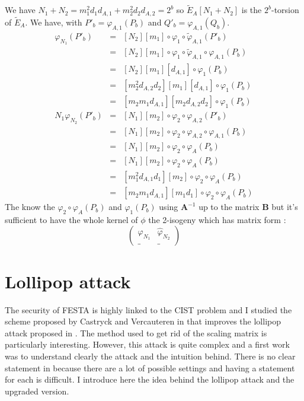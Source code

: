\documentclass[12pt,a4paper]{article}
\begin{document}
		We have $N_1 + N_2 = m_1^2d_1d_{A,1} + m_2^2d_2d_{A,2}=2^b$ so $\tilde{E}_A[N_1+N_2]$ is
		the $2^b$-torsion of $\tilde E_A$. We have, with $P'_b=\varphi_{A,1}(P_b)$ and 
		$Q'_b=\varphi_{A,1}(Q_b)$.
		\begin{eqnarray*}
			[N_2]\varphi_{N_1}(P'_b) & = & [N_2][m_1]\circ\varphi_1\circ\tilde\varphi_{A,1}(P'_b) \\
															 & = & [N_2][m_1]\circ\varphi_1\circ\tilde\varphi_{A,1}
															 \circ\varphi_{A,1}(P_b) \\
															 & = & [N_2][m_1][d_{A,1}]\circ\varphi_1(P_b) \\
															 & = & [m_2^2d_{A,2}d_2][m_1][d_{A,1}]\circ\varphi_1(P_b) \\
															 & = & [m_2m_1d_{A,1}][m_2d_{A,2}d_2]\circ\varphi_1(P_b) \\
			N_1\varphi_{N_2}(P'_b) & = & [N_1][m_2]\circ\varphi_2\circ\varphi_{A,2}(P'_b) \\
														 & = & [N_1][m_2]\circ\varphi_2\circ\varphi_{A,2}\circ\varphi_{A,1}(P_b) \\
														 & = & [N_1][m_2]\circ\varphi_2\circ\varphi_A(P_b) \\
														 & = & [N_1][m_2]\circ\varphi_2\circ\varphi_A(P_b) \\
														 & = & [m_1^2d_{A,1}d_1][m_2]\circ\varphi_2\circ\varphi_A(P_b) \\
														 & = & [m_2m_1d_{A,1}][m_1d_1]\circ\varphi_2\circ\varphi_A(P_b) 
		\end{eqnarray*}
		The know the $\varphi_2\circ\varphi_A(P_b)$ and $\varphi_1(P_b)$ using $\mathbf A^{-1}$
		up to the matrix $\mathbf B$ but
		it's sufficient to have the whole kernel of $\phi$ the 2-isogeny which has matrix form :
		$$\begin{pmatrix}
			\varphi_{N_1} & \widehat\varphi_{N_2} \\
		\_ & \_ \end{pmatrix}
		$$


		\section{Lollipop attack}

		The security of FESTA is highly linked to the CIST problem and I studied the scheme proposed 
		by Castryck and Vercauteren in \cite{polyCIST} that improves the lollipop attack proposed in 
		\cite{lollipop}. The method used to get rid of the scaling matrix is particularly interesting.
		However, this attack is quite complex and a first work was to understand clearly the attack and the
		intuition behind. There is no clear statement in \cite{polyCIST} because there are a lot of possible
		settings and having a statement for each is difficult. I introduce here the idea behind the lollipop
		attack and the upgraded version.
		
\end{document}
